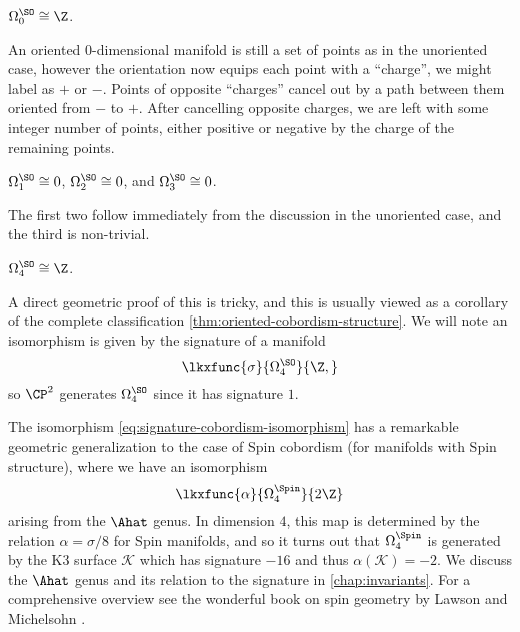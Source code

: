 \begin{example}
	$\Omega_0^\SO \cong \Z$. 

	An oriented 0-dimensional manifold is still a set of points as in the unoriented case, however the orientation now equips each point with a ``charge'', we might label as $+$ or $-$. Points of opposite ``charges'' cancel out by a path between them oriented from $-$ to $+$. After cancelling opposite charges, we are left with some integer number of points, either positive or negative by the charge of the remaining points.
\end{example}

\begin{example}
	$\Omega_1^\SO \cong 0$, $\Omega_2^\SO \cong 0$, and $\Omega_3^\SO \cong 0$.

	The first two follow immediately from the discussion in the unoriented case, and the third is non-trivial.
\end{example}

\begin{example}
	$\Omega_4^\SO \cong \Z$.

	A direct geometric proof of this is tricky, and this is usually viewed as a corollary of the complete classification \cref{thm:oriented-cobordism-structure}. 
	We will note an isomorphism is given by the signature of a manifold
	\begin{equation}\label{eq:signature-cobordism-isomorphism}
		\lkxfunc{\sigma}{\Omega_4^\SO}{\Z,}
	\end{equation}
	so $\CP^2$ generates $\Omega_4^\SO$ since it has signature $1$. 
\end{example}

\begin{remark}
	The isomorphism \cref{eq:signature-cobordism-isomorphism} has a remarkable geometric generalization to the case of Spin cobordism (for manifolds with Spin structure), where we have an isomorphism
	\[
		\lkxfunc{\alpha}{\Omega^\Spin_4}{2\Z}
	\]
	arising from the $\Ahat$ genus. In dimension $4$, this map is determined by the relation $\alpha=\sigma/8$ for Spin manifolds, and so it turns out that $\Omega^\Spin_4$ is generated by the K3 surface $\mathcal{K}$ which has signature $-16$ and thus $\alpha(\mathcal{K})=-2$.
	We discuss the $\Ahat$ genus and its relation to the signature in \cref{chap:invariants}. For a comprehensive overview see the wonderful book on spin geometry by Lawson and Michelsohn \cite{lawson1989spin}.
\end{remark}

